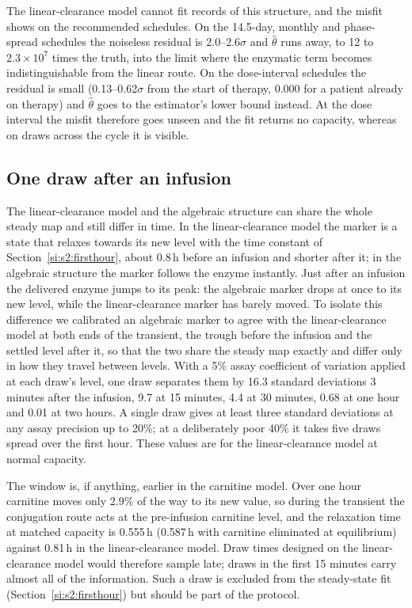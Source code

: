 The linear-clearance model cannot fit records of this structure, and the misfit shows on the
recommended schedules. On the 14.5-day, monthly and phase-spread schedules the noiseless residual
is 2.0--2.6$\sigma$ and $\hat\theta$ runs away, to 12 to $2.3\times10^{7}$ times the truth,
into the limit where the enzymatic term becomes indistinguishable from the linear route. On the
dose-interval schedules the residual is small (0.13--0.62$\sigma$ from the start of therapy, 0.000
for a patient already on therapy) and $\hat\theta$ goes to the estimator's lower bound instead.
At the dose interval the misfit therefore goes unseen and the fit returns no capacity, whereas on
draws across the cycle it is visible.

\subsection{One draw after an infusion}
\label{si:s3:draw}

The linear-clearance model and the algebraic structure can share the whole steady map and still
differ in time. In the linear-clearance model the marker is a state that relaxes towards its
new level with the time constant of Section~\ref{si:s2:firsthour}, about 0.8\,h before an
infusion and shorter after it; in the algebraic structure the marker follows the enzyme instantly. Just after an
infusion the delivered enzyme jumps to its peak: the algebraic marker drops at once to its new
level, while the linear-clearance marker has barely moved. To isolate this difference we
calibrated an algebraic marker to agree with the linear-clearance model at both ends of the
transient, the trough before the infusion and the settled level after it, so that the two share the steady map exactly and differ only in how they
travel between levels. With a 5\% assay coefficient of variation applied at each draw's level, one
draw separates them by 16.3 standard deviations 3 minutes after the infusion, 9.7 at 15 minutes,
4.4 at 30 minutes, 0.68 at one hour and 0.01 at two hours. A single draw gives at least three
standard deviations at any assay precision up to 20\%; at a deliberately poor 40\% it takes five
draws spread over the first hour. These values are for the linear-clearance model at normal
capacity.

The window is, if anything, earlier in the carnitine model. Over one hour carnitine moves only
2.9\% of the way to its new value, so during the transient the conjugation route acts at the
pre-infusion carnitine level, and the relaxation time at matched capacity is 0.555\,h (0.587\,h
with carnitine eliminated at equilibrium) against 0.81\,h in the linear-clearance model. Draw
times designed on the linear-clearance model would therefore sample late; draws in the first 15
minutes carry almost all of the information. Such a draw is excluded from the steady-state fit
(Section~\ref{si:s2:firsthour}) but should be part of the protocol.

